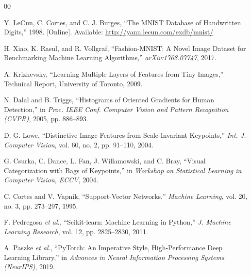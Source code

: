 \documentclass[conference]{IEEEtran}
\begin{document}
\begin{thebibliography}{00}

Y. LeCun, C. Cortes, and C. J. Burges, ``The MNIST Database of Handwritten Digits,'' 1998. [Online]. Available: \url{http://yann.lecun.com/exdb/mnist/}

H. Xiao, K. Rasul, and R. Vollgraf, ``Fashion-MNIST: A Novel Image Dataset for Benchmarking Machine Learning Algorithms,'' \textit{arXiv:1708.07747}, 2017.

A. Krizhevsky, ``Learning Multiple Layers of Features from Tiny Images,'' Technical Report, University of Toronto, 2009.

N. Dalal and B. Triggs, ``Histograms of Oriented Gradients for Human Detection,'' in \textit{Proc. IEEE Conf. Computer Vision and Pattern Recognition (CVPR)}, 2005, pp. 886--893.

D. G. Lowe, ``Distinctive Image Features from Scale-Invariant Keypoints,'' \textit{Int. J. Computer Vision}, vol. 60, no. 2, pp. 91--110, 2004.

G. Csurka, C. Dance, L. Fan, J. Willamowski, and C. Bray, ``Visual Categorization with Bags of Keypoints,'' in \textit{Workshop on Statistical Learning in Computer Vision, ECCV}, 2004.

C. Cortes and V. Vapnik, ``Support-Vector Networks,'' \textit{Machine Learning}, vol. 20, no. 3, pp. 273--297, 1995.

F. Pedregosa \textit{et al.}, ``Scikit-learn: Machine Learning in Python,'' \textit{J. Machine Learning Research}, vol. 12, pp. 2825--2830, 2011.

A. Paszke \textit{et al.}, ``PyTorch: An Imperative Style, High-Performance Deep Learning Library,'' in \textit{Advances in Neural Information Processing Systems (NeurIPS)}, 2019.

\end{thebibliography}
\end{document}
